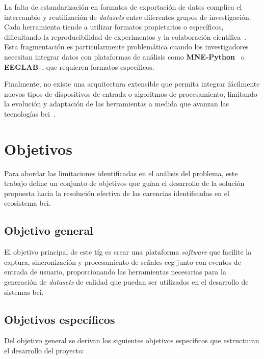 La falta de estandarización en formatos de exportación de datos complica el intercambio y reutilización de \textit{\glspl{dataset}} entre diferentes grupos de investigación. Cada herramienta tiende a utilizar formatos propietarios o específicos, dificultando la reproducibilidad de experimentos y la colaboración científica~\cite{bids,gorgolewski2016brain}. Esta fragmentación es particularmente problemática cuando los investigadores necesitan integrar datos con plataformas de análisis como \textbf{MNE-Python}~\cite{gramfort2013meg} o \textbf{EEGLAB}~\cite{delorme2004eeglab}, que requieren formatos específicos.

Finalmente, no existe una arquitectura extensible que permita integrar fácilmente nuevos tipos de dispositivos de entrada o algoritmos de procesamiento, limitando la evolución y adaptación de las herramientas a medida que avanzan las tecnologías \acrshort{bci}~\cite{schalk2004bci2000,lotte2013flaws,millán2004noninvasive}.

\section{Objetivos}
\label{sec:objetivos}

Para abordar las limitaciones identificadas en el análisis del problema, este trabajo define un conjunto de objetivos que guían el desarrollo de la solución propuesta hacia la resolución efectiva de las carencias identificadas en el ecosistema \acrshort{bci}.

\subsection{Objetivo general}
\label{subsec:objetivo_general}

El objetivo principal de este \acrfull{tfg} es crear una plataforma \textit{software} que facilite la captura, sincronización y procesamiento de señales \acrshort{eeg} junto con eventos de entrada de usuario, proporcionando las herramientas necesarias para la generación de \textit{\glspl{dataset}} de calidad que puedan ser utilizados en el desarrollo de sistemas \acrshort{bci}.

\subsection{Objetivos específicos}
\label{subsec:objetivos_especificos}

Del objetivo general se derivan los siguientes objetivos específicos que estructuran el desarrollo del proyecto:

